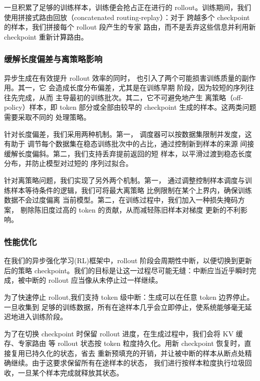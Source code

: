 \documentclass[
  10
]{article}
\begin{document}
一旦积累了足够的训练样本，训练便会抢占正在进行的
rollout。训练期间，我们使用拼接式路由回放（concatenated routing-replay）：对于
跨越多个 checkpoint 的样本，我们拼接每个 rollout 段产生的专家
路由，而不是丢弃这些信息并利用新 checkpoint
重新计算路由。



\subsubsection{缓解长度偏差与离策略影响}\label{mitigating-length-bias-and-off-policy-effects}

异步生成在有效提升 rollout 效率的同时，
也引入了两个可能损害训练质量的副作用。其一，它
会造成长度分布偏差，尤其是在训练早期
阶段，因为较短的序列往往先完成，从而
主导最初的训练批次。其二，它不可避免地产生
离策略（off-policy）样本，即 token 部分或全部由较早的 checkpoint 生成的样本。这两类问题需要采取不同的
处理策略。

针对长度偏差，我们采用两种机制。第一，
调度器可以按数据集限制并发度，这有助于
调节每个数据集在稳态训练批次中的占比，通过控制新到样本的来源
间接缓解长度偏斜。第二，我们支持丢弃提前返回的短
样本，以平滑过渡到稳态长度
分布，并防止模型对过短的
序列过拟合。

针对离策略问题，我们实现了另外两个机制。第一，
通过调整控制样本调度与训练样本等待条件的逻辑，我们可将最大离策略
比例限制在某个上界内，确保训练数据不会过度偏离
当前模型。第二，在训练过程中，我们加入一种损失掩码方案，
剔除陈旧度过高的 token 的贡献，从而减轻陈旧样本对梯度
更新的不利影响。
\subsubsection{性能优化}\label{performance-optimization}

在我们的异步强化学习(RL)框架中，rollout 阶段会周期性中断，以便切换到更新后的策略
checkpoint。我们的目标是让这一过程尽可能无缝：中断应当近乎瞬时完成，被中断的 rollout
应当像从未停止过一样继续。

为了快速停止 rollout,我们支持 token 级中断：生成可以在任意 token 边界停止。一旦收集到
足够的训练数据，所有在途样本几乎会立即停止，使系统能够毫无延迟地进入训练阶段。

为了在切换 checkpoint 时保留 rollout 进度，在生成过程中，我们会将 KV 缓存、专家路由
等 rollout 状态按 token 粒度持久化。用新 checkpoint 恢复时，直接复用已持久化的状态，省去
重新预填充的开销，并让被中断的样本从断点处精确继续。由于这要求保留所有在途样本的状态，
我们进行按样本粒度执行垃圾回收，一旦某个样本完成就释放其状态。
\end{document}
